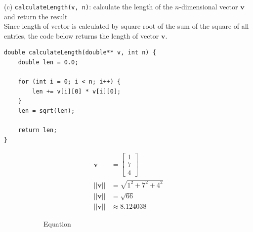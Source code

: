 (c) \texttt{calculateLength(v, n)}: calculate the length of the $n$-dimensional vector $\mathbf{v}$ and return the result\\
Since length of vector is calculated by square root of the sum of the square of all entries, the code below returns the length of vector $\mathbf{v}$.
\begin{verbatim}
double calculateLength(double** v, int n) {
    double len = 0.0;
    
    for (int i = 0; i < n; i++) {
        len += v[i][0] * v[i][0];
    }
    len = sqrt(len);
    
    return len;
}
\end{verbatim}
\begin{figure}[h]
    \centering
    \begin{subfigure}[b]{0.45\textwidth}
        \centering
        \begin {align*}
        \mathbf{v} &= \begin{bmatrix}
            1\\7\\4
        \end{bmatrix}\\
        ||\mathbf{v}|| &= \sqrt{1^2+7^2+4^2}\\
        ||\mathbf{v}|| &= \sqrt{66}\\
        ||\mathbf{v}|| &\approx 8.124038
        \end {align*}
        \caption{Equation}
        \label{fig:equation}
    \end{subfigure}
    \hfill
    \begin{subfigure}[b]{0.45\textwidth}
        \centering

\end{subfigure}
\end{figure}
